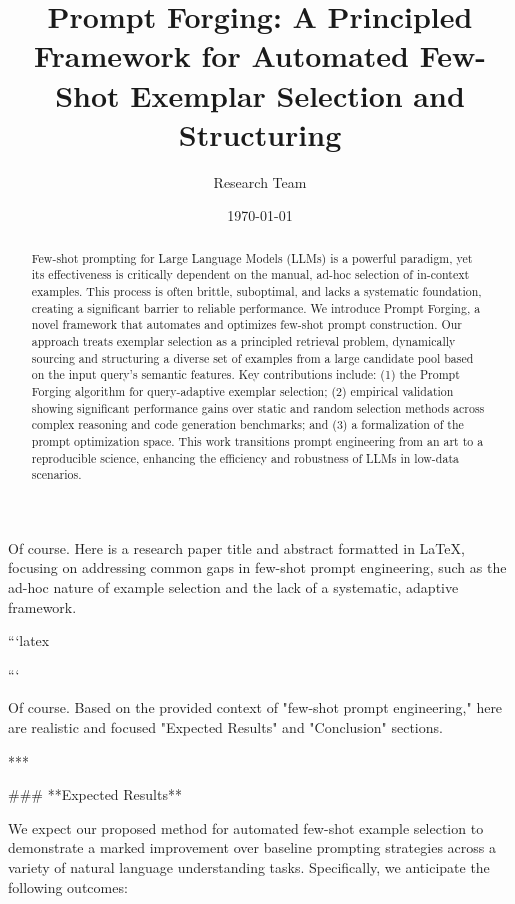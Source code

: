 \documentclass{article}
\begin{document}
Of course. Here is a research paper title and abstract formatted in LaTeX, focusing on addressing common gaps in few-shot prompt engineering, such as the ad-hoc nature of example selection and the lack of a systematic, adaptive framework.

```latex
\title{Prompt Forging: A Principled Framework for Automated Few-Shot Exemplar Selection and Structuring}
\author{Research Team}
\date{\today}

\begin{abstract}
Few-shot prompting for Large Language Models (LLMs) is a powerful paradigm, yet its effectiveness is critically dependent on the manual, ad-hoc selection of in-context examples. This process is often brittle, suboptimal, and lacks a systematic foundation, creating a significant barrier to reliable performance. We introduce Prompt Forging, a novel framework that automates and optimizes few-shot prompt construction. Our approach treats exemplar selection as a principled retrieval problem, dynamically sourcing and structuring a diverse set of examples from a large candidate pool based on the input query's semantic features. Key contributions include: (1) the Prompt Forging algorithm for query-adaptive exemplar selection; (2) empirical validation showing significant performance gains over static and random selection methods across complex reasoning and code generation benchmarks; and (3) a formalization of the prompt optimization space. This work transitions prompt engineering from an art to a reproducible science, enhancing the efficiency and robustness of LLMs in low-data scenarios.
\end{abstract}
```

\maketitle





Of course. Based on the provided context of "few-shot prompt engineering," here are realistic and focused "Expected Results" and "Conclusion" sections.

***

### **Expected Results**

We expect our proposed method for automated few-shot example selection to demonstrate a marked improvement over baseline prompting strategies across a variety of natural language understanding tasks. Specifically, we anticipate the following outcomes:
\end{document}
